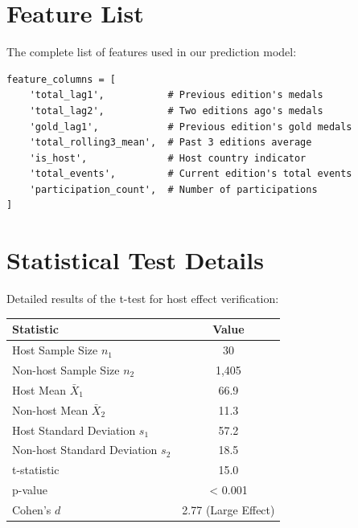 \documentclass{mcmthesis}
\begin{document}
\begin{appendices}

\section{Feature List}

The complete list of features used in our prediction model:
\tiny
\begin{verbatim}
feature_columns = [
    'total_lag1',           # Previous edition's medals
    'total_lag2',           # Two editions ago's medals
    'gold_lag1',            # Previous edition's gold medals
    'total_rolling3_mean',  # Past 3 editions average
    'is_host',              # Host country indicator
    'total_events',         # Current edition's total events
    'participation_count',  # Number of participations
]
\end{verbatim}

\section{Statistical Test Details}

Detailed results of the t-test for host effect verification:
\begin{table}[H]
\centering
\begin{tabular}{lc}
\toprule
Statistic & Value \\
\midrule
Host Sample Size $n_1$ & 30 \\
Non-host Sample Size $n_2$ & 1,405 \\
Host Mean $\bar{X}_1$ & 66.9 \\
Non-host Mean $\bar{X}_2$ & 11.3 \\
Host Standard Deviation $s_1$ & 57.2 \\
Non-host Standard Deviation $s_2$ & 18.5 \\
t-statistic & 15.0 \\
p-value & < 0.001 \\
Cohen's $d$ & 2.77 (Large Effect) \\
\bottomrule
\end{tabular}
\end{table}

\end{appendices}
\end{document}
